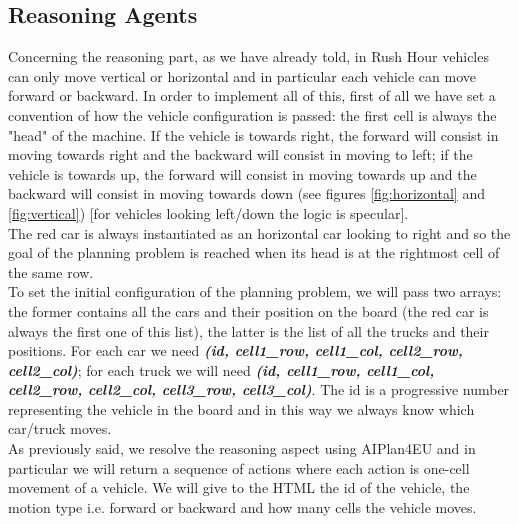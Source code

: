 \documentclass{article}
\begin{document}
\subsection{Reasoning Agents}
Concerning the reasoning part, as we have already told, in Rush Hour vehicles can only move vertical or horizontal and in particular each vehicle can move forward or backward. In order to implement all of this, first of all we have set a convention of how the vehicle configuration is passed: the first cell is always the "head" of the machine. If the vehicle is towards right, the forward will consist in moving towards right and the backward will consist in moving to left; if the vehicle is towards up, the forward will consist in moving towards up and the backward will consist in moving towards down (see figures \ref{fig:horizontal} and \ref{fig:vertical}) [for vehicles looking left/down the logic is specular].\\
\indent The red car is always instantiated as an horizontal car looking to right and so the goal of the planning problem is reached when its head is at the rightmost cell of the same row. \\
\indent To set the initial configuration of the planning problem, we will pass two arrays: the former contains all the cars and their position on the board (the red car is always the first one of this list), the latter is the list of all the trucks and their positions. For each car we need \textbf{\textit{(id, cell1\_row, cell1\_col, cell2\_row, cell2\_col)}}; for each truck we will need \textbf{\textit{(id, cell1\_row, cell1\_col, cell2\_row, cell2\_col, cell3\_row, cell3\_col)}}. The id is a progressive number representing the vehicle in the board and in this way we always know which car/truck moves.\\
\indent As previously said, we resolve the reasoning aspect using AIPlan4EU and in particular we will return a sequence of actions where each action is one-cell movement of a vehicle. We will give to the HTML the id of the vehicle, the motion type i.e. forward or backward and how many cells the vehicle moves.
\end{document}
